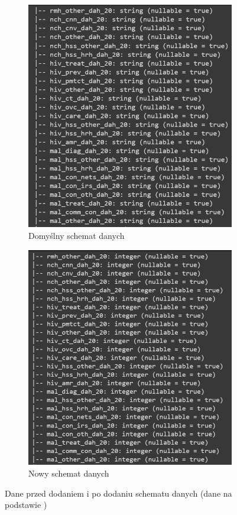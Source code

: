 \documentclass[11pt]{report}
\begin{document}
\begin{figure}[h]
    \begin{subfigure}{0.45\textwidth}
        \centering
        \includegraphics[width=.8\linewidth]{0003.png}
        \caption{Domyślny schemat danych}
        \label{fig:wykres3a}
    \end{subfigure}
    \begin{subfigure}{0.45\textwidth}
        \centering
        \includegraphics[width=.8\linewidth]{0004.png}
        \caption{Nowy schemat danych}
        \label{fig:wykres3b}
    \end{subfigure}
    \caption{Dane przed dodaniem i po dodaniu schematu danych (dane na podstawie \cite{daneMedyczne})}
    \label{fig:wykres3}
\end{figure}
\end{document}
